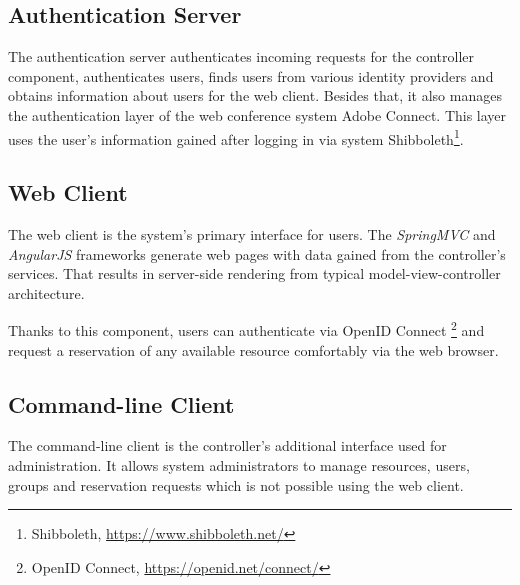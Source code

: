 \subsection{Authentication Server}
The authentication server authenticates incoming requests for the controller component, authenticates users, finds users from various identity providers and obtains information about users for the web client.
Besides that, it also manages the authentication layer of the web conference system Adobe Connect. This layer uses the user's information gained after logging in via system Shibboleth\footnote{Shibboleth, \url{https://www.shibboleth.net/}}.

\subsection{Web Client} \label{webclient}
The web client is the system's primary interface for users. The \emph{SpringMVC} and \emph{AngularJS} frameworks generate web pages with data gained from the controller’s services. That results in server-side rendering from typical model-view-controller architecture.

Thanks to this component, users can authenticate via OpenID Connect \footnote{OpenID Connect, \url{https://openid.net/connect/}} and request a reservation of any available resource comfortably via the web browser.

\subsection{Command-line Client}
The command-line client is the controller's additional interface used for administration. It allows system administrators to manage resources, users, groups and reservation requests which is not possible using the web client.

